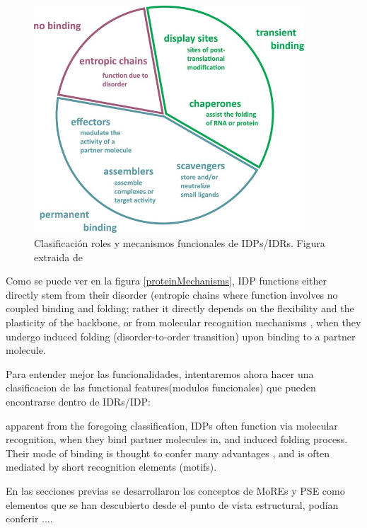 \begin{figure}[h!,centered]
\centering
\includegraphics[width=0.9\textwidth]{img/idpFunctionMechanisms.jpg} 
\caption{Clasificación roles y mecanismos funcionales de IDPs/IDRs. Figura extraida de \cite{van2014classification}}
\label{idpFunctions}
\end{figure}


Como se puede ver en la figura \ref{proteinMechanisms}, IDP functions either directly stem from their disorder (entropic chains where function
involves no coupled binding and folding; rather it directly depends on the flexibility and the plasticity of the backbone, 
or from molecular recognition mechanisms , when they undergo induced folding (disorder-to-order transition) upon binding to a partner molecule.


Para entender mejor las funcionalidades, intentaremos ahora hacer una clasificacion de las functional features(modulos funcionales) que pueden encontrarse dentro de IDRs/IDP:

apparent from the foregoing classification, IDPs often
function via molecular recognition, when they bind partner
molecules in, and induced folding process. Their mode of
binding is thought to confer many advantages %
, and is often
mediated by short recognition elements (motifs)\cite{neduva2005systematic,fuxreiter2007local,davey2012attributes}.


En las secciones previas se desarrollaron los conceptos de MoREs y PSE como elementos que se han descubierto desde el punto de vista estructural, podían conferir ....

